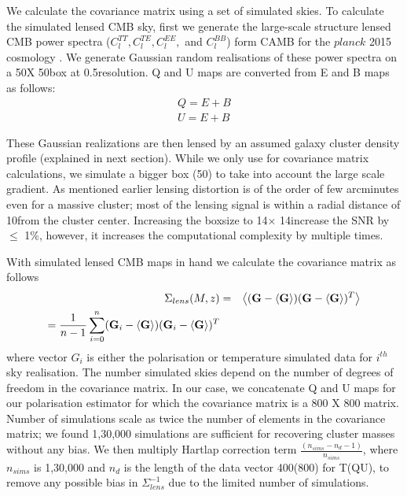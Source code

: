  We calculate the covariance matrix using a set of simulated skies. 
 To calculate the simulated lensed CMB sky, first we generate the large-scale structure lensed CMB power spectra ($C^{TT}_{l}, C^{TE}_{l}, C^{EE}_{l},$ and $C^{BB}_{l}$) form CAMB for the $planck$ 2015 cosmology \citep{planck15_13}.  
 We generate Gaussian random realisations of these power spectra on a 50\am X 50\am box at 0.5\am resolution. 
 Q and U maps are converted from E and B maps as follows:
 \begin{eqnarray}
Q = E + B\\
U = E + B
 \label{eq:coord_trans}
 \end{eqnarray}
 
 These Gaussian realizations are then lensed by an assumed galaxy cluster density profile (explained in next section). 
 While we only use  \smallboxsize  for covariance matrix calculations, we simulate a bigger box (50\am) to take into account the large scale gradient.
 As mentioned earlier lensing distortion is of the order of few arcminutes even for a massive cluster; most of the lensing signal is within a radial distance of  10\am from the cluster center.
Increasing the boxsize to 14\am $\times$ 14\am increase the SNR by $\le$ 1\%, however, it increases the computational complexity by multiple times.

 
 With simulated lensed CMB maps in hand we calculate the covariance matrix as follows
 \begin{eqnarray}
\Sigma_{lens}(M,z) & = & \left<(\textrm{\textbf{G}} - \left<\textrm{\textbf{G}}\right>) (\textrm{\textbf{G}} - \left<\textrm{\textbf{G}}\right>)^{T}\right>\\
  =   \frac{1}{n-1}\sum\limits_{i = 0}^{n} (\textrm{\textbf{G}}_{i} - \left<\textrm{\textbf{G}}\right>) (\textrm{\textbf{G}}_{i} - \left<\textrm{\textbf{G}}\right>)^{T} %
\label{eq_lensed_cmb_cov_mass_z}
\end{eqnarray}
 where vector $G_{i}$ is either the polarisation or temperature simulated data for $i^{th}$ sky realisation. 
 The number simulated skies depend on the number of degrees of freedom in the covariance matrix. 
 In our case, we concatenate Q and U maps for our polarisation estimator for which the covariance matrix is a 800 X 800 matrix. 
 Number of simulations scale as twice the number of elements in the covariance matrix; we found 1,30,000 simulations are sufficient for recovering cluster masses without any bias. 
  We then multiply Hartlap correction term $\frac{(n_{sims} -n_{d} -1)}{n_{sims}}$, where $n_{sims}$ is 1,30,000 and $n_{d}$ is the length of the data vector 400(800) for T(QU), to remove any possible bias in $\Sigma^{-1}_{lens}$ due to the limited number of simulations. 
  
